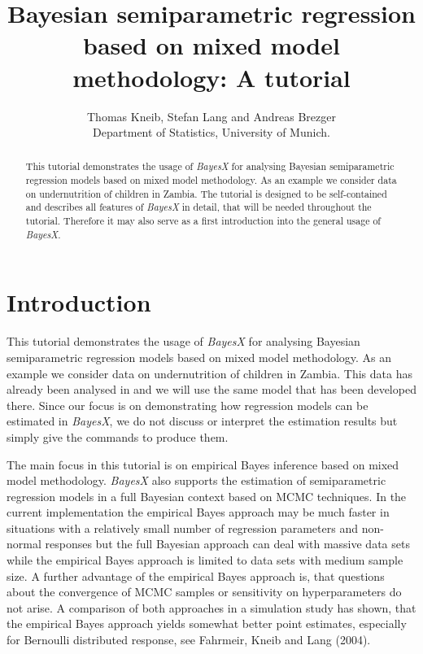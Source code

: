 \documentclass[a4paper]{article}
\begin{document}
\title{Bayesian semiparametric regression based on mixed model methodology: A tutorial}
\author{Thomas Kneib, Stefan Lang and Andreas Brezger\\ [.25cm]
\normalsize Department of Statistics, University of Munich. }
\maketitle

\begin{abstract}
This tutorial demonstrates the usage of {\it BayesX} for analysing
Bayesian semiparametric regression models based on mixed model
methodology. As an example we consider data on undernutrition of
children in Zambia. The tutorial is designed to be self-contained
and describes all features of {\it BayesX} in detail, that will be
needed throughout the tutorial. Therefore it may also serve as a
first introduction into the general usage of {\em BayesX}.
\end{abstract}

\tableofcontents

\newpage
\section{Introduction}\label{data}

This tutorial demonstrates the usage of {\it BayesX} for analysing
Bayesian semiparametric regression models based on mixed model
methodology. As an example we consider data on undernutrition of
children in Zambia. This data has already been analysed in  and we will use the same model
that has been developed there. Since our focus is on demonstrating
how regression models can be estimated in {\em BayesX}, we do not
discuss or interpret the estimation results but simply give the
commands to produce them.

The main focus in this tutorial is on empirical Bayes inference
based on mixed model methodology. {\it BayesX} also supports the
estimation of semiparametric regression models in a full Bayesian
context based on MCMC techniques. In the current implementation the
empirical Bayes approach may be much faster in situations with a
relatively small number of regression parameters and non-normal
responses but the full Bayesian approach can deal with massive data
sets while the empirical Bayes approach is limited to data sets with
medium sample size. A further advantage of the empirical Bayes
approach is, that questions about the convergence of MCMC samples or
sensitivity on hyperparameters do not arise. A comparison of both
approaches in a simulation study has shown, that the empirical Bayes
approach yields somewhat better point estimates, especially for
Bernoulli distributed response, see Fahrmeir, Kneib and Lang (2004).
\end{document}
